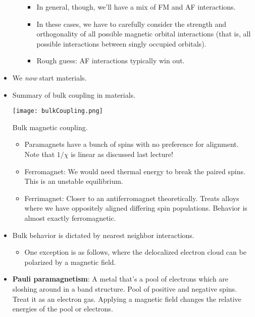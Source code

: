 \documentclass[../notes.tex]{subfiles}
\begin{document}
\begin{itemize}
\begin{itemize}
\begin{itemize}
            \item In general, though, we'll have a mix of FM and AF interactions.
            \item In these cases, we have to carefully consider the strength and orthogonality of all possible magnetic orbital interactions (that is, all possible interactions between singly occupied orbitals).
            \item Rough guess: AF interactions typically win out.
        \end{itemize}
    \end{itemize}
    \item We \emph{now} start materials.
    \item Summary of bulk coupling in materials.
    \begin{table}[H]
        \centering
        \texttt{[image: bulkCoupling.png]}
        \caption{Bulk magnetic coupling.}
        \label{fig:bulkCoupling}
    \end{table}
    \begin{itemize}
        \item Paramagnets have a bunch of spins with no preference for alignment. Note that $1/\chi$ is linear as discussed last lecture!
        \item Ferromagnet: We would need thermal energy to break the paired spins. This is an unstable equilibrium.
        \item Ferrimagnet: Closer to an antiferromagnet theoretically. Treats alloys where we have oppositely aligned differing spin populations. Behavior is almost exactly ferromagnetic.
    \end{itemize}
    \item Bulk behavior is dictated by nearest neighbor interactions.
    \begin{itemize}
        \item One exception is as follows, where the delocalized electron cloud can be polarized by a magnetic field.
    \end{itemize}
    \item \textbf{Pauli paramagnetism}: A metal that's a pool of electrons which are sloshing around in a band structure. Pool of positive and negative spins. Treat it as an electron gas. Applying a magnetic field changes the relative energies of the pool or electrons.
    \begin{figure}[h!]
        \centering
\end{figure}
\end{itemize}
\end{document}

